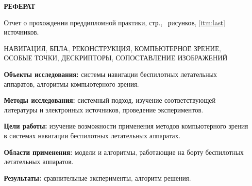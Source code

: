 \begin{center}
  \large\bfseries{РЕФЕРАТ}
\end{center}

Отчет о прохождении преддипломной практики, \pageref{LastPage} стр., \totalfigures\ рисунков, \ref{itm:last} источников.

\begin{center}
  \large{НАВИГАЦИЯ, БПЛА, РЕКОНСТРУКЦИЯ, КОМПЬЮТЕРНОЕ ЗРЕНИЕ, ОСОБЫЕ ТОЧКИ, ДЕСКРИПТОРЫ, СОПОСТАВЛЕНИЕ ИЗОБРАЖЕНИЙ}
\end{center}

\textbf{Объекты исследования:} системы навигации беспилотных летательных аппаратов, алгоритмы компьютерного зрения.

\textbf{Методы исследования:} системный подход, изучение соответствующей литературы и электронных источников, проведение экспериментов.

\textbf{Цели работы:} изучение возможности применения методов компьютерного зрения в системах навигации беспилотных летательных аппаратах.

\textbf{Области применения:} модели и алгоритмы, работающие на борту беспилотных летательных аппаратов.

\textbf{Результаты:} сравнительные эксперименты, алгоритм решения.

\newpage
